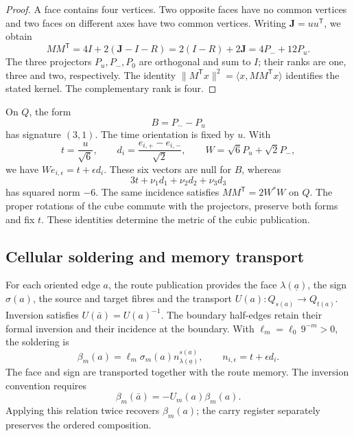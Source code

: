 \begin{proof}
A face contains four vertices. Two opposite faces have no common
vertices and two faces on different axes have two common vertices.
Writing \(\mathbf J=uu^{\mathsf T}\), we obtain
\[
 MM^{\mathsf T}=4I+2(\mathbf J-I-R)
 =2(I-R)+2\mathbf J=4P_-+12P_u.
\]
The three projectors \(P_u,P_-,P_0\) are orthogonal and sum to \(I\);
their ranks are one, three and two, respectively. The identity
\(\|M^{\mathsf T}x\|^2=\langle x,MM^{\mathsf T}x\rangle\)
identifies the stated kernel. The complementary rank is four.
\end{proof}

On \(Q\), the form
\[
 B=P_--P_u
\]
has signature \((3,1)\). The time orientation is fixed by \(u\).
With
\[
 t=\frac{u}{\sqrt6},\qquad
 d_i=\frac{e_{i,+}-e_{i,-}}{\sqrt2},\qquad
 W=\sqrt6P_u+\sqrt2P_-,
\]
we have \(We_{i,\epsilon}=t+\epsilon d_i\). These six vectors
are null for \(B\), whereas
\[
 3t+\nu_1d_1+\nu_2d_2+\nu_3d_3
\]
has squared norm \(-6\). The same incidence satisfies
\(MM^{\mathsf T}=2W^*W\) on \(Q\). The proper rotations of the cube
commute with the projectors, preserve both forms and fix \(t\).
These identities determine the metric of the cubic publication.

\subsection{Cellular soldering and memory transport}
\label{vii:vii:sec:soldadura-celular}

For each oriented edge \(a\), the route publication provides
the face \(\lambda(\underline a)\), the sign
\(\sigma(a)\), the source and target fibres and the transport
\(U(a):Q_{s(a)}\longrightarrow Q_{t(a)}\).
Inversion satisfies \(U(\bar a)=U(a)^{-1}\).
The boundary half-edges retain their formal inversion and their incidence
at the boundary. With \(\ell_m=\ell_0\,9^{-m}>0\), the soldering is
\begin{equation}
 \beta_m(a)=\ell_m\sigma_m(a)
              n_{\lambda(\underline a)}^{s(a)},\qquad
 n_{i,\epsilon}=t+\epsilon d_i.
 \label{vii:vii:eq:soldadura-arista}
\end{equation}
The face and sign are transported together with the route memory.
The inversion convention requires
\begin{equation}
 \beta_m(\bar a)=-U_m(a)\beta_m(a).
 \label{vii:vii:eq:inversion-soldadura}
\end{equation}
Applying this relation twice recovers \(\beta_m(a)\);
the carry register separately preserves the ordered composition.

